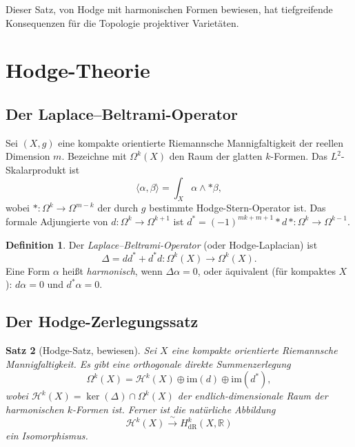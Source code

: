 \documentclass[12pt,a4paper]{amsart}
\newtheorem{theorem}{Satz}[section]
\theoremstyle{definition}
\newtheorem{definition}[theorem]{Definition}
\theoremstyle{remark}
\begin{document}
Dieser Satz, von Hodge mit harmonischen Formen bewiesen, hat tiefgreifende Konsequenzen
für die Topologie projektiver Varietäten.

\section{Hodge-Theorie}
\label{sec:hodge-theorie}

\subsection{Der Laplace–Beltrami-Operator}

Sei $(X,g)$ eine kompakte orientierte Riemannsche Mannigfaltigkeit der reellen Dimension $m$.
Bezeichne mit $\Omega^k(X)$ den Raum der glatten $k$-Formen. Das $L^2$-Skalarprodukt ist
\[
  \langle \alpha, \beta \rangle = \int_X \alpha \wedge *\beta,
\]
wobei $*: \Omega^k \to \Omega^{m-k}$ der durch $g$ bestimmte Hodge-Stern-Operator ist.
Das formale Adjungierte von $d: \Omega^k \to \Omega^{k+1}$ ist
$d^* = (-1)^{mk+m+1} * d\, * : \Omega^k \to \Omega^{k-1}$.

\begin{definition}
Der \emph{Laplace–Beltrami-Operator} (oder Hodge-Laplacian) ist
\[
  \Delta = dd^* + d^*d : \Omega^k(X) \longrightarrow \Omega^k(X).
\]
Eine Form $\alpha$ heißt \emph{harmonisch}, wenn $\Delta\alpha = 0$, oder äquivalent
(für kompaktes $X$): $d\alpha = 0$ und $d^*\alpha = 0$.
\end{definition}

\subsection{Der Hodge-Zerlegungssatz}

\begin{theorem}[Hodge-Satz, bewiesen]
\label{thm:hodge-main}
Sei $X$ eine kompakte orientierte Riemannsche Mannigfaltigkeit. Es gibt eine orthogonale
direkte Summenzerlegung
\[
  \Omega^k(X) = \mathcal{H}^k(X) \oplus \mathrm{im}(d) \oplus \mathrm{im}(d^*),
\]
wobei $\mathcal{H}^k(X) = \ker(\Delta) \cap \Omega^k(X)$ der endlich-dimensionale Raum
der harmonischen $k$-Formen ist. Ferner ist die natürliche Abbildung
\[
  \mathcal{H}^k(X) \xrightarrow{\;\sim\;} H^k_{\mathrm{dR}}(X, \mathbb{R})
\]
ein Isomorphismus.
\end{theorem}
\end{document}
